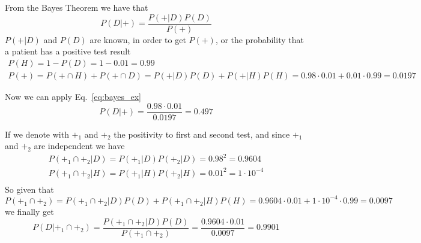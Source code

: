 \cprotEnv\begin{solution}
From the Bayes Theorem we have that 
\begin{equation}
	P(D|+) = \frac{P(+|D)P(D)}{P(+)}
	\label{eq:bayes_ex}
\end{equation}	
$P(+|D)$ and $P(D)$ are known, in order to get $P(+)$, or the probability that a patient has a positive test result
\begin{equation}
	\begin{gathered}
P(H) = 1 - P(D) = 1 - 0.01 = 0.99\\
P(+) = P(+\cap H)+P(+\cap D) = P(+|D)P(D) + P(+|H)P(H) =0.98\cdot0.01+0.01\cdot0.99 = 0.0197
\end{gathered}
\end{equation}

Now we can apply Eq.~\ref{eq:bayes_ex}
\begin{equation*}
	P(D|+) = \frac{0.98\cdot0.01}{0.0197}=0.497
\end{equation*}

If we denote with $+_1$ and $+_2$ the positivity to first and second test, and since $+_1$ and $+_2$ are independent we have
\begin{equation*}
	\begin{gathered}
	P(+_1\cap +_2 | D) = P(+_1 | D) P(+_2 | D) = 0.98^2=0.9604\\
	P(+_1\cap +_2 | H) = P(+_1 | H) P(+_2 | H) = 0.01^2=1\cdot 10^{-4}\\
	\end{gathered}
\end{equation*}
So given that 
\begin{equation*}
P(+_1\cap +_2) = P(+_1\cap +_2 | D)P(D) + P(+_1\cap +_2 | H)P(H) = 0.9604\cdot 0.01 + 1\cdot 10^{-4}\cdot 0.99=0.0097
\end{equation*}
we finally get
\begin{equation*}
	P(D|+_1\cap +_2) = \frac{P(+_1\cap +_2 | D)P(D)}{P(+_1\cap +_2)} = \frac{0.9604\cdot 0.01}{0.0097} = 0.9901
\end{equation*}
\end{solution}
